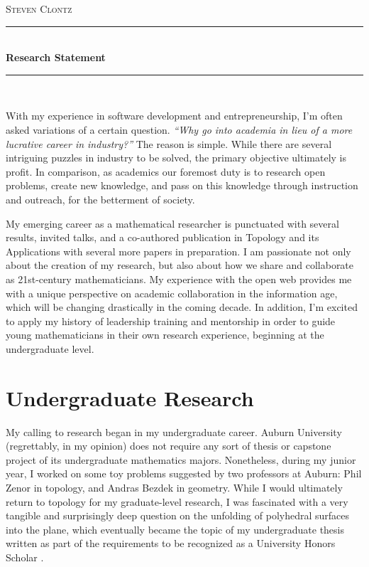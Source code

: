 \documentclass[11pt]{amsart}
\theoremstyle{plain}
\newcommand{\HRule}{\rule{\linewidth}{0.5mm}}
\newcommand{\<}{\langle}
\renewcommand{\>}{\rangle}
\begin{document}
\begin{center}

\textsc{\huge Steven Clontz}

\HRule \\[0.1cm]
{ \huge \bfseries Research Statement \\[0.4cm] }

\HRule \\[1.5cm]

\end{center}


With my experience in software development and entrepreneurship, I'm
often asked variations of a certain question. \textit{``Why go into academia in
lieu of a more lucrative career in industry?''} The reason is simple. While
there are several intriguing puzzles in industry to be solved, the primary
objective ultimately is profit. In comparison, as academics our foremost duty
is to research open problems, create new knowledge, and pass on this knowledge
through instruction and outreach, for the betterment of society.

My emerging career as a mathematical researcher is punctuated with several
results, invited talks, and a co-authored publication in Topology and its
Applications with several more papers in preparation. I am passionate not
only about the creation of my research, but
also about how we share and collaborate as 21st-century mathematicians. My
experience with the open web provides me with a unique perspective on academic
collaboration in the information age, which will be changing drastically
in the coming decade. In addition, I'm excited to apply my history of
leadership training and mentorship in order to guide young mathematicians
in their own research experience, beginning at the undergraduate level.


\section*{Undergraduate Research}

My calling to research began in my undergraduate career. Auburn University
(regrettably, in my opinion) does not require any sort of thesis or capstone
project of its undergraduate mathematics majors. Nonetheless, during my junior
year, I worked on some toy problems suggested by two professors at Auburn:
Phil Zenor in topology, and Andras Bezdek in geometry. While I would ultimately
return to topology for my graduate-level research, I was fascinated with a
very tangible and surprisingly deep question on the unfolding of polyhedral
surfaces into the plane, which eventually became the topic of my undergraduate
thesis written as part of the requirements to be recognized as a University
Honors Scholar \cite{UNDERGRAD}.
\end{document}
